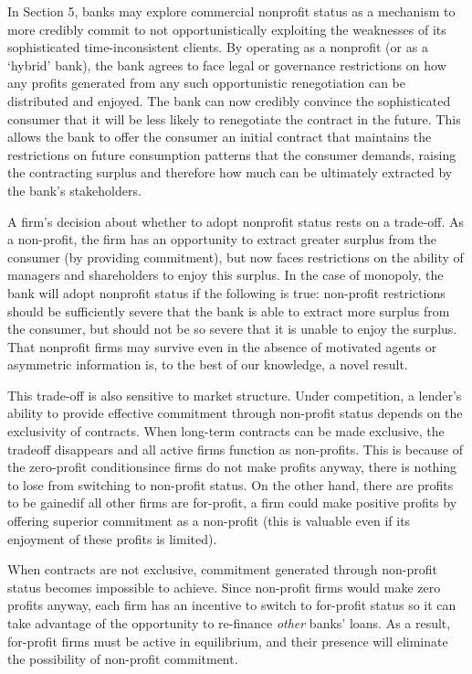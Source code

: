 \documentclass[11pt,english]{article}
\theoremstyle{plain}
\theoremstyle{definition}
\begin{document}
In Section 5, banks may explore commercial nonprofit status as a mechanism
to more credibly commit to not opportunistically exploiting the weaknesses
of its sophisticated time-inconsistent clients. By operating as a
nonprofit (or as a `hybrid' bank), the bank agrees to face legal or
governance restrictions on how any profits generated from any such
opportunistic renegotiation can be distributed and enjoyed. The bank
can now credibly convince the sophisticated consumer that it will
be less likely to renegotiate the contract in the future. This allows
the bank to offer the consumer an initial contract that maintains
the restrictions on future consumption patterns that the consumer
demands, raising the contracting surplus and therefore how much can
be ultimately extracted by the bank's stakeholders.

A firm's decision about whether to adopt nonprofit status rests on
a trade-off. As a non-profit, the firm has an opportunity to extract
greater surplus from the consumer (by providing commitment), but now
faces restrictions on the ability of managers and shareholders to
enjoy this surplus. In the case of monopoly, the bank will adopt nonprofit
status if the following is true: non-profit restrictions should be
sufficiently severe that the bank is able to extract more surplus
from the consumer, but should not be so severe that it is unable to
enjoy the surplus. That nonprofit firms may survive even in the absence
of motivated agents or asymmetric information is, to the best of our
knowledge, a novel result.

This trade-off is also sensitive to market structure. Under competition,
a lender's ability to provide effective commitment through non-profit
status depends on the exclusivity of contracts. When long-term contracts
can be made exclusive, the tradeoff disappears and all active firms
function as non-profits. This is because of the zero-profit condition\textendash since
firms do not make profits anyway, there is nothing to lose from switching
to non-profit status. On the other hand, there are profits to be gained\textendash if
all other firms are for-profit, a firm could make positive profits
by offering superior commitment as a non-profit (this is valuable
even if its enjoyment of these profits is limited).

When contracts are not exclusive, commitment generated through non-profit
status becomes impossible to achieve. Since non-profit firms would
make zero profits anyway, each firm has an incentive to switch to
for-profit status so it can take advantage of the opportunity to re-finance
\textit{other} banks' loans. As a result, for-profit firms must be
active in equilibrium, and their presence will eliminate the possibility
of non-profit commitment.
\end{document}
